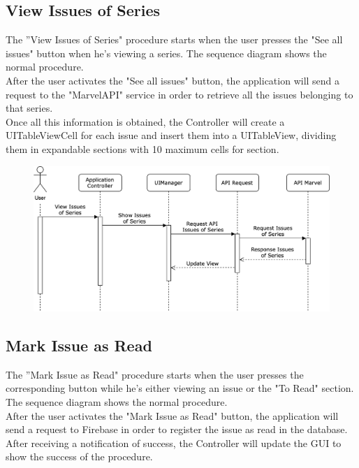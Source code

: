 \clearpage

\subsection{View Issues of Series}
The ”View Issues of Series" procedure starts when the user presses the "See all issues" button when he's viewing a series. The sequence diagram shows the normal procedure. \\
After the user activates the "See all issues" button, the application will send a request to the "MarvelAPI" service in order to retrieve all the issues belonging to that series. \\
Once all this information is obtained, the Controller will create a UITableViewCell for each issue and insert them into a UITableView, dividing them in expandable sections with 10 maximum cells for section. 

\vspace{5mm}

\begin{figure}[h]
\centering
\includegraphics[width=\textwidth]{img/seqdiagrams/viewissuesofseries}
\end{figure}

\clearpage

\subsection{Mark Issue as Read}
The ”Mark Issue as Read" procedure starts when the user presses the corresponding button while he's either viewing an issue or the "To Read" section. The sequence diagram shows the normal procedure. \\
After the user activates the "Mark Issue as Read" button, the application will send a request to Firebase in order to register the issue as read in the database. \\
After receiving a notification of success, the Controller will update the GUI to show the success of the procedure. 

